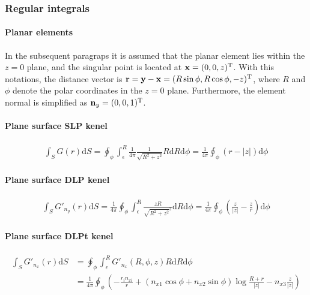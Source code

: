 \documentclass[a4paper,11pt]{article}
\newcommand{\td}{\mathrm{d}}
\begin{document}
\subsubsection{Regular integrals}

\paragraph{Planar elements}

In the subsequent paragraps it is assumed that the planar element lies within the $z=0$ plane, and the singular point is located at ${\bf x} = (0, 0, z)^{\mathrm{T}}$. With this notations, the distance vector is ${\bf r} = {\bf y} - {\bf x} = (R \sin\phi, R \cos\phi, -z)^{\mathrm{T}}$, where $R$ and $\phi$ denote the polar coordinates in the $z = 0$ plane. Furthermore, the element normal is simplified as ${\bf n}_y = (0, 0, 1)^{\mathrm{T}}$.

\paragraph {Plane surface SLP kenel}

\begin{align}
		\int_{S} G(r) \td S
		=
		\oint_{\phi}
		\int_{\epsilon}^{R}
			\frac{1}{4\pi} \frac{1}{\sqrt{R^2 + z^2}} R
		\td R
		\td \phi
		=
		\frac{1}{4\pi}
		\oint_{\phi}
		(r - |z|)
		\td \phi
\end{align}


\paragraph {Plane surface DLP kenel}

\begin{align}
		\int_{S} G'_{n_y}(r) \td S
		=
		\frac{1}{4\pi}
		\oint_{\phi}
		\int_{\epsilon}^{R}
			\frac{z R}{\sqrt{R^2 + z^2}^3}
		\td R
		\td \phi
		=
		\frac{1}{4\pi}
		\oint_{\phi}
		\left(\frac{z}{|z|} - \frac{z}{r}\right)
		\td \phi
\end{align}


\paragraph {Plane surface DLPt kenel}

\begin{align}
		\int_{S}
			G'_{n_x}(r)
		\td S
		&=
		\oint_{\phi}
		\int_{\epsilon}^{R}
			G'_{n_x}(R, \phi, z) R
		\td R
		\td \phi \\
		&=
		\frac{1}{4\pi}
		\oint_{\phi}
		\left(
		-\frac{r_i n_{xi}}{r}
		+
		(n_{x1} \cos\phi + n_{x2} \sin\phi) \log\frac{R + r}{|z|}
        - n_{x3} \frac{z}{|z|}
		\right)
\end{align}
\end{document}
